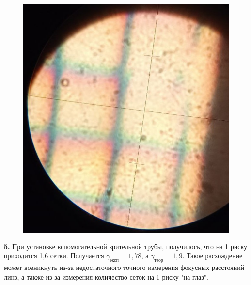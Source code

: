 \documentclass[a4paper,12pt]{article}
\begin{document}
\begin{figure}[H]
	\centering
	\includegraphics[scale=0.3]{photo1.jpg}
\end{figure}

\textbf{5.} При установке вспомогательной зрительной трубы, получилось, что на 1 риску приходится 1,6 сетки. Получается $\gamma_\text{эксп} = 1,78$, а $\gamma_\text{теор} = 1,9$. Такое расхождение может возникнуть из-за недостаточного точного измерения фокусных расстояний линз, а также из-за измерения количество сеток на 1 риску "на глаз".
\end{document}
